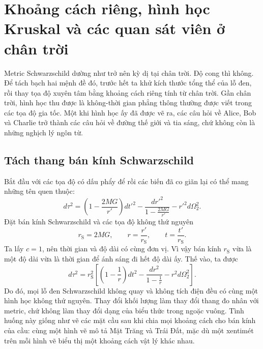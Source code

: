 \chapter{Khoảng cách riêng, hình học Kruskal và các quan sát viên ở chân trời}

Metric Schwarzschild dường như trở nên kỳ dị tại chân trời. Độ cong thì không. Để tách bạch hai mệnh đề đó, trước hết ta khử kích thước tổng thể của lỗ đen, rồi thay tọa độ xuyên tâm bằng khoảng cách riêng tính từ chân trời. Gần chân trời, hình học thu được là không-thời gian phẳng thông thường được viết trong các tọa độ gia tốc. Một khi hình học ấy đã được vẽ ra, các câu hỏi về Alice, Bob và Charlie trở thành các câu hỏi về đường thế giới và tia sáng, chứ không còn là những nghịch lý ngôn từ.

\section{Tách thang bán kính Schwarzschild}

Bắt đầu với các tọa độ có dấu phẩy để rồi các biến đã co giãn lại có thể mang những tên quen thuộc:
\begin{equation}
d\tau^2
=
\left(1-\frac{2MG}{r'}\right)dt'^2
-
\frac{dr'^2}{1-\frac{2MG}{r'}}
-
r'^2d\Omega_2^2.
\label{eq:l7-schwarzschild-dimensional}
\end{equation}
Đặt bán kính Schwarzschild và các tọa độ không thứ nguyên
\begin{equation}
r_{\mathrm S}=2MG,
\qquad
r=\frac{r'}{r_{\mathrm S}},
\qquad
t=\frac{t'}{r_{\mathrm S}}.
\label{eq:l7-rescaling}
\end{equation}
Ta lấy \(c=1\), nên thời gian và độ dài có cùng đơn vị. Vì vậy bán kính \(r_{\mathrm S}\) vừa là một độ dài vừa là thời gian để ánh sáng đi hết độ dài ấy. Thế vào, ta được
\begin{equation}
d\tau^2
=r_{\mathrm S}^2
\left[
\left(1-\frac1r\right)dt^2
-
\frac{dr^2}{1-\frac1r}
-
r^2d\Omega_2^2
\right].
\label{eq:l7-schwarzschild-rescaled}
\end{equation}
Do đó, mọi lỗ đen Schwarzschild không quay và không tích điện đều có cùng một hình học không thứ nguyên. Thay đổi khối lượng làm thay đổi thang đo nhân với metric, chứ không làm thay đổi dạng của biểu thức trong ngoặc vuông. Tình huống này giống như vẽ các mặt cầu sau khi chia mọi khoảng cách cho bán kính của cầu: cùng một hình vẽ mô tả Mặt Trăng và Trái Đất, mặc dù một xentimét trên mỗi hình vẽ biểu thị một khoảng cách vật lý khác nhau.

